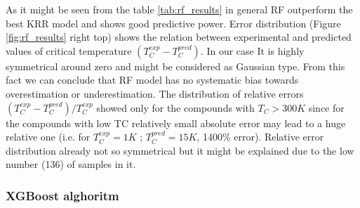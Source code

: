 As it might be seen from the table \ref{tab:rf_results} in general RF outperform the best KRR model and shows good predictive power. Error distribution (Figure \ref{fig:rf_results} right top) shows the relation between experimental and predicted values of critical temperature $(T_C^{exp} - T_C^{pred})$. In our case It is highly symmetrical around zero and might be considered as Gaussian type. From this fact we can conclude that RF model has no systematic bias towards overestimation or underestimation. The distribution of relative errors $(T_C^{exp} - T_C^{pred}) / T_C^{exp}$ showed only for the compounds with $T_C>300K$ since for the compounds with low TC relatively small absolute error may lead to a huge relative one (i.e. for $T_C^{exp} = 1 K$ ; $T_C^{pred} = 15 K$, 1400\% error). Relative error distribution already not so symmetrical but it might be explained due to the low number (136) of samples in it.

\subsubsection{XGBoost alghoritm}

